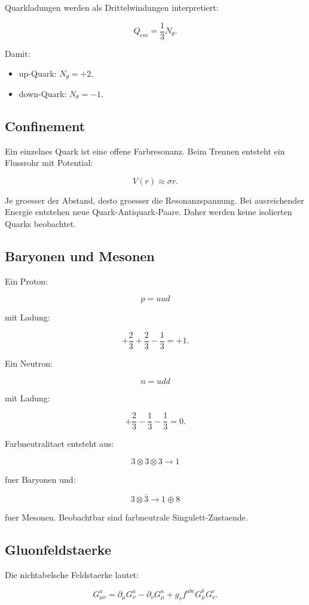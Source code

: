 \documentclass[11pt,a4paper]{article}
\begin{document}
Quarkladungen werden als Drittelwindungen interpretiert:

\[
Q_{em}=\frac{1}{3}N_\theta.
\]

Damit:
\begin{itemize}
  \item up-Quark: $N_\theta=+2$,
  \item down-Quark: $N_\theta=-1$.
\end{itemize}

\subsection{Confinement}

Ein einzelnes Quark ist eine offene Farbresonanz. Beim Trennen entsteht ein Flussrohr mit Potential:

\[
V(r)\approx \sigma r.
\]

Je groesser der Abstand, desto groesser die Resonanzspannung. Bei ausreichender Energie entstehen neue
Quark-Antiquark-Paare. Daher werden keine isolierten Quarks beobachtet.

\subsection{Baryonen und Mesonen}

Ein Proton:

\[
p=uud
\]

mit Ladung:

\[
+\frac{2}{3}+\frac{2}{3}-\frac{1}{3}=+1.
\]

Ein Neutron:

\[
n=udd
\]

mit Ladung:

\[
+\frac{2}{3}-\frac{1}{3}-\frac{1}{3}=0.
\]

Farbneutralitaet entsteht aus:

\[
3\otimes 3\otimes 3 \rightarrow 1
\]

fuer Baryonen und:

\[
3\otimes \bar{3}\rightarrow 1\oplus 8
\]

fuer Mesonen. Beobachtbar sind farbneutrale Singulett-Zustaende.

\subsection{Gluonfeldstaerke}

Die nichtabelsche Feldstaerke lautet:

\[
G_{\mu\nu}^a
=
\partial_\mu G_\nu^a
-
\partial_\nu G_\mu^a
+
g_sf^{abc}G_\mu^bG_\nu^c.
\]
\end{document}
